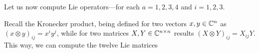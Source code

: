 


Let us now compute Lie operators---for each $a=1,2,3,4$ and $i=1,2,3$.

Recall the Kronecker product, being defined for two vectors $x,y\in\mathbb{C}^n$ as $(x\otimes y)_{ij}=x^iy^j$, while for two matrices $X,Y\in\mathbb{C}^{n\times n}$ results $(X\otimes Y)_{ij}=X_{ij}Y$. This way, we can compute the twelve Lie matrices 


